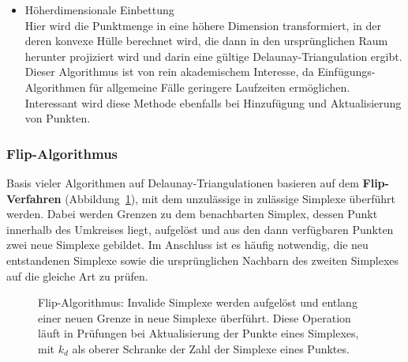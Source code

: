 \begin{itemize}
\item Höherdimensionale Einbettung\\
  Hier wird die Punktmenge in eine höhere Dimension transformiert, in der deren konvexe Hülle berechnet wird, die dann in den ursprünglichen Raum herunter projiziert wird und darin eine gültige Delaunay-Triangulation ergibt.
  Dieser Algorithmus ist von rein akademischem Interesse, da Einfügungs-Algorithmen für allgemeine Fälle geringere Laufzeiten ermöglichen.
  Interessant wird diese Methode ebenfalls bei Hinzufügung und Aktualisierung von Punkten.

\end{itemize}

\subsubsection{Flip-Algorithmus}

Basis vieler Algorithmen auf Delaunay-Triangulationen basieren auf dem \textbf{Flip-Verfahren} (Abbildung~\ref{fig:delaunay-flip}), mit dem unzulässige in zulässige Simplexe überführt werden.
Dabei werden Grenzen zu dem benachbarten Simplex, dessen Punkt innerhalb des Umkreises liegt, aufgelöst und aus den dann verfügbaren Punkten zwei neue Simplexe gebildet.
Im Anschluss ist es häufig notwendig, die neu entstandenen Simplexe sowie die ursprünglichen Nachbarn des zweiten Simplexes auf die gleiche Art zu prüfen.

\begin{figure}
  \caption[Flip-Algorithmus]{
    Flip-Algorithmus: Invalide Simplexe werden aufgelöst und entlang einer neuen Grenze in neue Simplexe überführt.
    Diese Operation läuft in  Prüfungen bei Aktualisierung der Punkte eines Simplexes, mit $k_d$ als oberer Schranke der Zahl der Simplexe eines Punktes.
  }
  \label{fig:delaunay-flip}
\end{figure}

